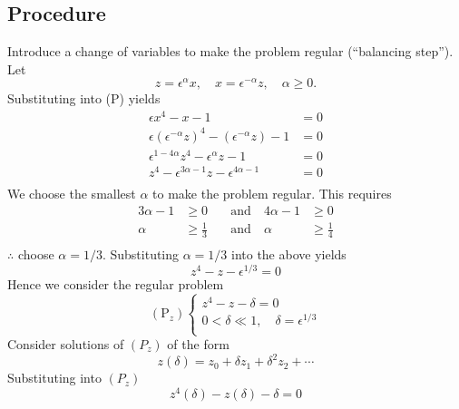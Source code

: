 \documentclass[12pt,twoside]{article}
\begin{document}
\subsection{Procedure}
Introduce a change of variables to make the problem regular (``balancing
step''). Let
\begin{equation*}
  z=\epsilon^\alpha x,\quad x=\epsilon^{-\alpha}z,\quad \alpha\ge0.
\end{equation*}
Substituting into (P) yields
\begin{equation*}
  \begin{aligned}
    \epsilon x^4-x-1&=0 \\
    \epsilon{(\epsilon^{-\alpha}z)}^4-(\epsilon^{-\alpha}z)-1&=0 \\
    \epsilon^{1-4\alpha}z^4-\epsilon^{\alpha}z-1&=0 \\
    z^4-\epsilon^{3\alpha-1}z-\epsilon^{4\alpha-1}&=0 \\
  \end{aligned}
\end{equation*}
We choose the smallest $\alpha$ to make the problem regular. This requires
\begin{equation*}
  \begin{aligned}
    3\alpha-1&\ge0 \quad&\text{and}\quad 4\alpha-1&\ge0 \\
    \alpha&\ge\frac{1}{3} \quad&\text{and}\quad \alpha&\ge\frac{1}{4} \\
  \end{aligned}
\end{equation*}
$\therefore$ choose $\alpha=1/3$. Substituting $\alpha=1/3$ into the above yields
\begin{equation*}
  z^4-z-\epsilon^{1/3}=0
\end{equation*}
Hence we consider the regular problem
\begin{equation*} (\text{P}_z)\left\{
  \begin{aligned}
    z^4-z-\delta=0 \\
    0<\delta\ll1,\quad \delta=\epsilon^{1/3} \\
  \end{aligned} \right.
\end{equation*}
Consider solutions of $(P_z)$ of the form
\begin{equation*}
  z(\delta)=z_0+\delta z_1 + \delta^2z_2 + \cdots
\end{equation*}
Substituting into $(P_z)$
\begin{equation}
  \label{eq:sing-pert-star}
  z^4(\delta) - z(\delta) - \delta = 0
\end{equation}
\end{document}
